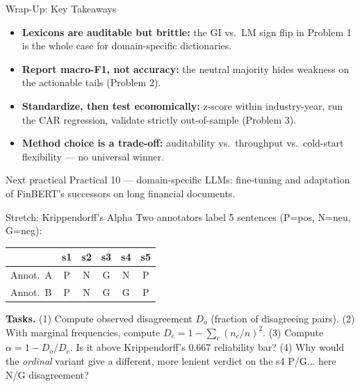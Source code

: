 \documentclass[9pt,t]{beamer}
\begin{document}
\begin{frame}{Wrap-Up: Key Takeaways}
\begin{itemize}
  \item \textbf{Lexicons are auditable but brittle:} the GI vs.\ LM sign flip in
        Problem 1 is the whole case for domain-specific dictionaries.
  \item \textbf{Report macro-F1, not accuracy:} the neutral majority hides weakness
        on the actionable tails (Problem 2).
  \item \textbf{Standardize, then test economically:} z-score within industry-year,
        run the CAR regression, validate strictly out-of-sample (Problem 3).
  \item \textbf{Method choice is a trade-off:} auditability vs.\ throughput vs.\
        cold-start flexibility --- no universal winner.
\end{itemize}

\medskip
\begin{block}{Next practical}
Practical 10 --- domain-specific LLMs: fine-tuning and adaptation of FinBERT's
successors on long financial documents.
\end{block}
\end{frame}

\appendixstart{Stretch Problems}

\begin{frame}[noframenumbering]{Stretch: Krippendorff's Alpha}
Two annotators label 5 sentences (P=pos, N=neu, G=neg):
\begin{center}
\begin{tabular}{lccccc}
\toprule
        & s1 & s2 & s3 & s4 & s5 \\
\midrule
Annot.\ A & P & N & G & N & P \\
Annot.\ B & P & N & G & G & P \\
\bottomrule
\end{tabular}
\end{center}
\textbf{Tasks.} (1) Compute observed disagreement $D_o$ (fraction of disagreeing
pairs). (2) With marginal frequencies, compute $D_e=1-\sum_c(n_c/n)^2$.
(3) Compute $\alpha=1-D_o/D_e$. Is it above Krippendorff's 0.667 reliability bar?
(4) Why would the \emph{ordinal} variant give a different, more lenient verdict
on the s4 P/G... here N/G disagreement?
\end{frame}
\end{document}
